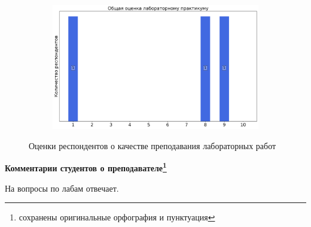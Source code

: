 \begin{figure}[H]
\begin{subfigure}[b]{0.45\textwidth}
			\end{subfigure}
			\begin{subfigure}[b]{0.45\textwidth}
				\centering
				\includegraphics[width=\textwidth]{images/3 course/Аналоговая электроника/labniks-marks-Дунаева М.А.-3.png}
			\end{subfigure}	
			\caption{Оценки респондентов о качестве преподавания лабораторных работ}
		\end{figure}

		\textbf{Комментарии студентов о преподавателе\protect\footnote{сохранены оригинальные орфография и пунктуация}}
            \begin{commentbox} 
                На вопросы по лабам отвечает.  
            \end{commentbox} 
        

